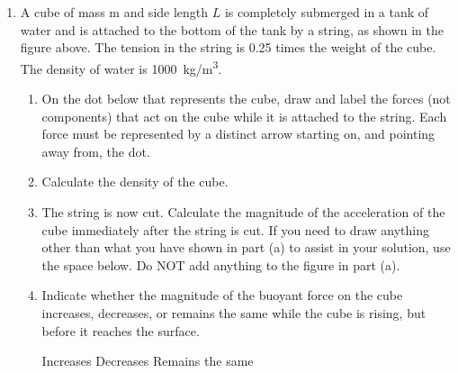 \documentclass{../../../oss-apphys}
\begin{document}
\begin{enumerate}[leftmargin=15pt]
  \begin{center}
  \end{center}
\item A cube of mass m and side length $L$ is completely submerged in a tank of
  water and is attached to the bottom of the tank by a string, as shown in the
  figure above. The tension in the string is 0.25 times the weight of the cube.
  The density of water is \SI{1000}{kg/m^3}.
  \begin{enumerate}[leftmargin=18pt]
  \item On the dot below that represents the cube, draw and label the forces
    (not components) that act on the cube while it is attached to the string.
    Each force must be represented by a distinct arrow starting on, and pointing
    away from, the dot.
    \begin{center}
      \vspace{.5in}
      \vspace{.5in}
    \end{center}
  \item Calculate the density of the cube.
  \item\vspace{.3in}The string is now cut. Calculate the magnitude of the
    acceleration of the cube immediately after the string is cut. If you need
    to draw anything other than what you have shown in part (a) to assist in
    your solution, use the space below. Do NOT add anything to the figure in
    part (a).
  \item Indicate whether the magnitude of the buoyant force on the cube
    increases, decreases, or remains the same while the cube is rising, but
    before it reaches the surface.

    \vspace{.1in}
    \underline{\hspace{.3in}} Increases\hspace{.2in}
    \underline{\hspace{.3in}} Decreases\hspace{.2in}
    \underline{\hspace{.3in}} Remains the same


\end{enumerate}
\end{enumerate}
\end{document}
